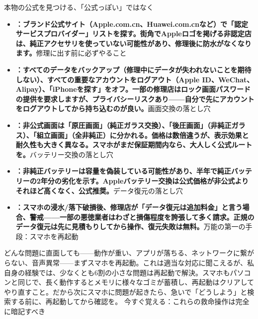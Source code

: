 本物の公式を見つける、「公式っぽい」ではなく

\begin{itemize}
  \item \textbf{：ブランド公式サイト（Apple.com.cn、Huawei.com.cnなど）で「認定サービスプロバイダー」リストを探す。街角でAppleロゴを掲げる非認定店は、純正アクセサリを使っていない可能性があり、修理後に防水がなくなります。}修理に出す前に必ずやること
  \item \textbf{：すべてのデータをバックアップ（修理中にデータが失われないことを期待しない）、すべての重要なアカウントをログアウト（Apple ID、WeChat、Alipay）、「iPhoneを探す」をオフ。一部の修理店はロック画面パスワードの提供を要求しますが、プライバシーリスクあり——自分で先にアカウントをログアウトしてから持ち込むのが良い。}画面交換の落とし穴
  \item \textbf{：非公式画面は「原圧画面」（純正ガラス交換）、「後圧画面」（非純正ガラス）、「組立画面」（全非純正）に分かれる。価格は数倍違うが、表示効果と耐久性も大きく異なる。スマホがまだ保証期間内なら、大人しく公式ルートを。}バッテリー交換の落とし穴
  \item \textbf{：非純正バッテリーは容量を偽装している可能性があり、半年で純正バッテリーの2年分の劣化を示す。Appleバッテリー交換は公式価格が非公式よりそれほど高くなく、公式推奨。}データ復元の落とし穴
  \item \textbf{：スマホの浸水/落下破損後、修理店が「データ復元は追加料金」と言う場合、警戒——一部の悪徳業者はわざと損傷程度を誇張して多く請求。正規のデータ復元は先に見積もりしてから操作、復元失敗は無料。}万能の第一の手段：スマホを再起動
\end{itemize}

\begin{tcbwarn}{どんな問題に直面しても——動作が重い、アプリが落ちる、ネットワークに繋がらない、音声異常——まずスマホを再起動。これは適当な対応に聞こえるが、私自身の経験では、少なくとも6割の小さな問題は再起動で解決。スマホもパソコンと同じで、長く動作するとメモリに様々なゴミが蓄積し、再起動はクリアしてやり直すこと。だから次にスマホに問題が起きたら、急いで「どうしよう」と検索する前に、再起動してから確認を。}
今すぐ覚える：これらの救命操作は完全に暗記すべき

\end{tcbwarn}

